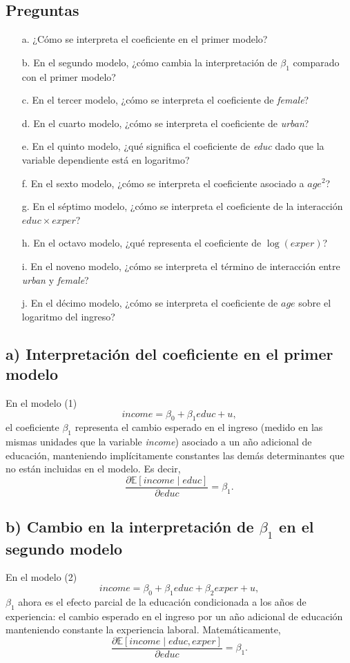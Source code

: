\documentclass[12pt]{article}
\begin{document}
\subsection*{Preguntas}

\begin{enumerate}
    \item[a.] ¿Cómo se interpreta el coeficiente en el primer modelo?
    \item[b.] En el segundo modelo, ¿cómo cambia la interpretación de $\beta_{1}$ comparado con el primer modelo?
    \item[c.] En el tercer modelo, ¿cómo se interpreta el coeficiente de \textit{female}?
    \item[d.] En el cuarto modelo, ¿cómo se interpreta el coeficiente de \textit{urban}?
    \item[e.] En el quinto modelo, ¿qué significa el coeficiente de \textit{educ} dado que la variable dependiente está en logaritmo?
    \item[f.] En el sexto modelo, ¿cómo se interpreta el coeficiente asociado a $age^{2}$?
    \item[g.] En el séptimo modelo, ¿cómo se interpreta el coeficiente de la interacción $educ \times exper$?
    \item[h.] En el octavo modelo, ¿qué representa el coeficiente de $\log(exper)$?
    \item[i.] En el noveno modelo, ¿cómo se interpreta el término de interacción entre \textit{urban} y \textit{female}?
    \item[j.] En el décimo modelo, ¿cómo se interpreta el coeficiente de $age$ sobre el logaritmo del ingreso?
\end{enumerate}

\subsection*{a) Interpretación del coeficiente en el primer modelo}
En el modelo (1)
\[
income = \beta_{0} + \beta_{1}educ + u,
\]
el coeficiente $\beta_{1}$ representa el cambio esperado en el ingreso (medido en las mismas unidades que la variable \textit{income}) asociado a un año adicional de educación, manteniendo implícitamente constantes las demás determinantes que no están incluidas en el modelo. Es decir,
\[
\frac{\partial \mathbb{E}[income \mid educ]}{\partial educ} = \beta_{1}.
\]


\subsection*{b) Cambio en la interpretación de $\beta_{1}$ en el segundo modelo}
En el modelo (2)
\[
income = \beta_{0} + \beta_{1}educ + \beta_{2}exper + u,
\]
$\beta_{1}$ ahora es el efecto parcial de la educación condicionada a los años de experiencia: el cambio esperado en el ingreso por un año adicional de educación manteniendo constante la experiencia laboral. Matemáticamente,
\[
\frac{\partial \mathbb{E}[income \mid educ, exper]}{\partial educ} = \beta_{1}.
\]
\end{document}
